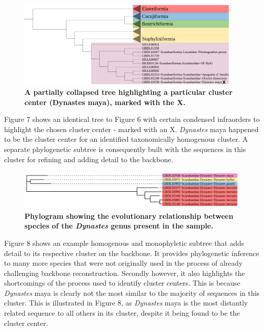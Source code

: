 \documentclass[12pt]{article}
\begin{document}
  \begin{figure}[H]
    \centering
    \includegraphics[width=0.95\textwidth]{bbzoomfour.png}
    \captionsetup{margin=0.75cm}
      \caption{\textbf{\small A partially collapsed tree highlighting a particular cluster center (Dynastes maya), marked with the X.}}
  \end{figure}

  Figure 7 shows an identical tree to Figure 6 with certain condensed infraorders to highlight the chosen cluster center - marked with an X. \textit{Dynastes} maya happened to be the cluster center for an identified taxonomically homogenous cluster. A separate phylogenetic subtree is consequently built with the sequences in this cluster for refining and adding detail to the backbone.   

  \begin{figure}[H]
    \centering
    \includegraphics[width=1\textwidth]{moeny.png}
    \captionsetup{margin=0.75cm}
      \caption{\textbf{\small Phylogram showing the evolutionary relationship between species of the \textit{Dynastes} genus present in the sample.}}
  \end{figure}

  Figure 8 shows an example homogenous and monophyletic subtree that adds detail to its respective cluster on the backbone. It provides phylogenetic inference to many more species that were not originally used in the process of already challenging backbone reconstruction. Secondly however, it also highlights the shortcomings of the process used to identify cluster centers. This is because \textit{Dynastes} maya is clearly not the most similar to the majority of sequences in this cluster. This is illustrated in Figure 8, as \textit{Dynastes} maya is the most distantly related sequence to all others in its cluster, despite it being found to be the cluster center.
\end{document}
